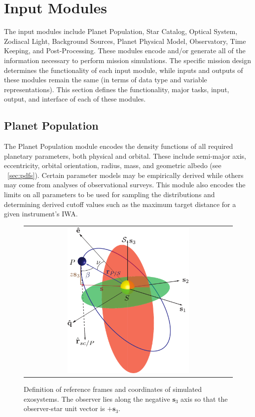 \documentclass[cleanfoot]{asme2ej}
\def\mf{\mathbf}
\begin{document}
\section{Input Modules}\label{sec:modules}
The input modules include Planet Population, Star Catalog, Optical System, Zodiacal Light, Background Sources, Planet Physical Model, Observatory, Time Keeping, and Post-Processing.  These modules encode and/or generate all of the information necessary to perform mission simulations.  The specific mission design determines the functionality of each input module, while inputs and outputs of these modules remain the same (in terms of data type and variable representations).  This section defines the functionality, major tasks, input, output, and interface of each of these modules.


\subsection{Planet Population}
The Planet Population module encodes the density functions of all required planetary parameters, both physical and orbital. These include semi-major axis, eccentricity, orbital orientation, radius, mass, and geometric albedo (see ~\ref{sec:pdfs}). Certain parameter models may be empirically derived while others may come from analyses of observational surveys.  This module also encodes the limits on all parameters to be used for sampling the distributions and determining derived cutoff values such as the maximum target distance for a given instrument's IWA.

\begin{figure}[ht]
    \begin{center}
        \begin{tabular}{c}
             \includegraphics[width=0.6\textwidth]{orbit_diagram}
        \end{tabular}
    \end{center}
    \caption{\label{fig:orbit_diagram} Definition of reference frames and coordinates of simulated exosystems.  The observer lies along the negative $\mf s_3$ axis so that the observer-star unit vector is $+\mf s_3$.}
\end{figure}
\end{document}
